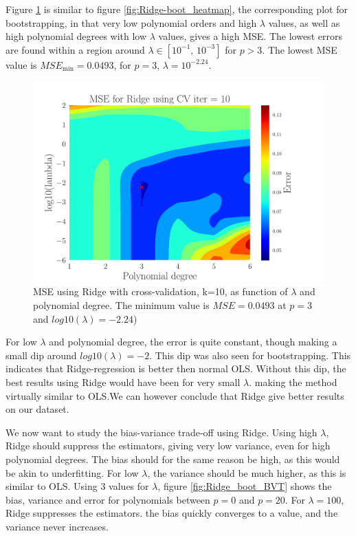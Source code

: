 \documentclass[reprint,english,notitlepage,aps,nobalancelastpage,nofootinbib]{revtex4-1}  %
\begin{document}
Figure \ref{fig:Ridge_CV_heatmap} is similar to figure \ref{fig:Ridge-boot_heatmap}, the corresponding plot for bootstrapping, in that very low polynomial orders and high $\lambda$ values, as well as high polynomial degrees with low $\lambda$ values, gives a high MSE. The lowest errors are found within a region around $\lambda\in[10^{-1},\,10^{-3}]$ for $p>3$. The lowest MSE value is $MSE_\text{min}=0.0493$, for $p=3,\, \lambda=10^{-2.24}$.

\begin{figure}[h]
	\begin{center}
		\includegraphics[width=0.8\linewidth]{Contour_PL_Ridge_CV10_n30_eps0.2_p1_6_lmb2_m6.pdf}
	\end{center}
	\caption{MSE using Ridge with cross-validation, k=10, as function of $\lambda$ and polynomial degree. The minimum value is $MSE=0.0493$ at $p=3$ and $log10(\lambda)=-2.24$)}
	\label{fig:Ridge_CV_heatmap}
\end{figure}

For low $\lambda$ and polynomial degree, the error is quite constant, though making a small dip around $log10(\lambda)=-2$. This dip was also seen for bootstrapping. This indicates that Ridge-regression is better then normal OLS. Without this dip, the best results using Ridge would have been for very small $\lambda$. making the method virtually similar to OLS.We can however conclude that Ridge give better results on our dataset.



We now want to study the bias-variance trade-off using Ridge. Using high $\lambda$, Ridge should suppress the estimators, giving very low variance, even for high polynomial degrees. The bias should for the same reason be high, as this would be akin to underfitting. For low $\lambda$, the variance should be much higher, as this is similar to OLS.  Using 3 values for $\lambda$, figure \ref{fig:Ridge_boot_BVT} shows the bias, variance and error for polynomials between $p=0$ and $p=20$. For $\lambda=100$, Ridge suppresses the estimators.   the bias quickly converges to a value, and the variance never increases.
\end{document}
